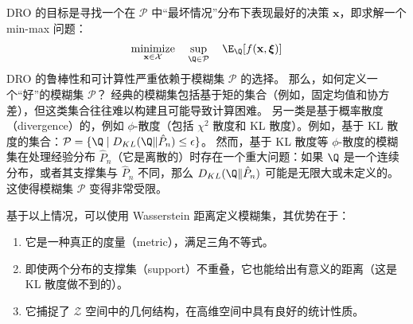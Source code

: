 \documentclass[lang=cn,newtx,10pt,scheme=chinese,chinesefont=nofont,citestyle=gb7714-2015, bibstyle=gb7714-2015]{elegantbook}
\DeclareMathOperator*{\minimize}{minimize}
\newcommand{\bx}{\mathbf{x}} %
\newcommand{\bxi}{\boldsymbol{\xi}} %
\newcommand{\Pcal}{\mathcal{P}} %
\newcommand{\Xcal}{\mathcal{X}} %
\newcommand{\Zcal}{\mathcal{Z}} %
\newcommand{\Phat}{\hat{P}_n} %
\begin{document}
\begin{refsection}
DRO 的目标是寻找一个在 $\Pcal$ 中“最坏情况”分布下表现最好的决策 $\bx$，即求解一个 min-max 问题：
\begin{equation}
\label{eq:dro}
\minimize_{\bx \in \Xcal} \quad \sup_{\Q \in \Pcal} \quad \E_{\Q}[f(\bx, \bxi)]
\end{equation}
DRO 的鲁棒性和可计算性严重依赖于模糊集 $\Pcal$ 的选择。
那么，如何定义一个“好”的模糊集 $\Pcal$？
经典的模糊集包括基于矩的集合（例如，固定均值和协方差），但这类集合往往难以构建且可能导致计算困难。 另一类是基于概率散度（divergence）的，例如 $\phi$-散度（包括 $\chi^2$ 散度和 KL 散度）。例如，基于 KL 散度的集合：$\Pcal = \{ \Q \mid D_{KL}(\Q \| \Phat) \le \epsilon \}$。
然而，基于 KL 散度等 $\phi$-散度的模糊集在处理经验分布 $\Phat$（它是离散的）时存在一个重大问题：如果 $\Q$ 是一个连续分布，或者其支撑集与 $\Phat$ 不同，那么 $D_{KL}(\Q \| \Phat)$ 可能是无限大或未定义的。这使得模糊集 $\Pcal$ 变得非常受限。



基于以上情况，可以使用 Wasserstein 距离定义模糊集，其优势在于：
\begin{enumerate}
    \item 它是一种真正的度量（metric），满足三角不等式。
    \item 即使两个分布的支撑集（support）不重叠，它也能给出有意义的距离（这是 KL 散度做不到的）。
    \item 它捕捉了 $\Zcal$ 空间中的几何结构，在高维空间中具有良好的统计性质。
\end{enumerate}


\end{refsection}
\end{document}
